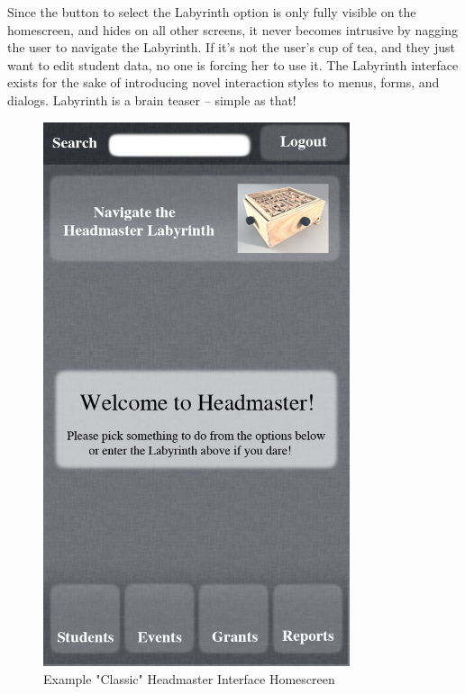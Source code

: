 \documentclass{article}
\begin{document}
Since the button to select the Labyrinth option is only fully visible on the homescreen, and hides on all other screens, it never becomes intrusive by nagging the user to navigate the Labyrinth.  If it’s not the user’s cup of tea, and they just want to edit student data, no one is forcing her to use it.  The Labyrinth interface exists for the sake of introducing novel interaction styles to menus, forms, and dialogs.  Labyrinth is a brain teaser – simple as that!

\begin{figure}
\centering
\includegraphics[width=90mm]{classic-homepage.jpg}
\caption{Example "Classic" Headmaster Interface Homescreen}
\end{figure}
\end{document}
